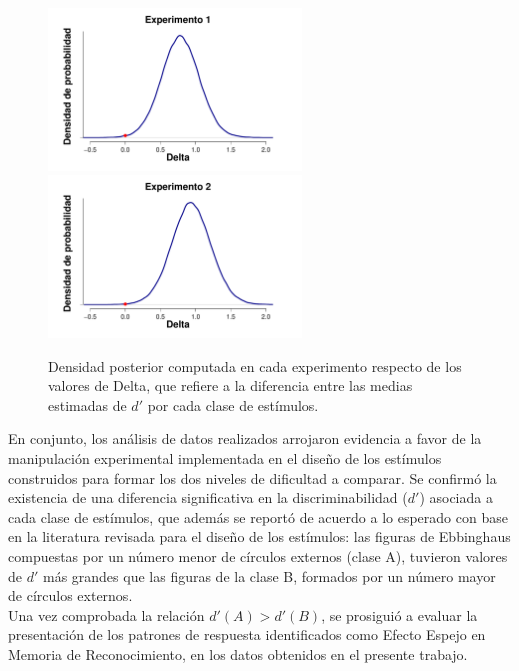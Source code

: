 \begin{figure}[th]
\centering
\includegraphics[width=0.6\textwidth]{Figures/MDelta_DensidadDelta_E1}\\
\includegraphics[width=0.6\textwidth]{Figures/MDelta_DensidadDelta_E2}\\
\caption[Modelo Delta: Densidad posterior de los valores estimados para el parámetro Delta en cada Experimento]{Densidad posterior computada en cada experimento respecto de los valores de Delta, que refiere a la diferencia entre las medias estimadas de $d'$ por cada clase de estímulos.}
\label{fig:Delta}
\end{figure}

En conjunto, los análisis de datos realizados arrojaron evidencia a favor de la manipulación experimental implementada en el diseño de los estímulos construidos para formar los dos niveles de dificultad a comparar. Se confirmó la existencia de una diferencia significativa en la discriminabilidad ($d'$) asociada a cada clase de estímulos, que además se reportó de acuerdo a lo esperado con base en la literatura revisada para el diseño de los estímulos: las figuras de Ebbinghaus compuestas por un número menor de círculos externos (clase A), tuvieron valores de $d'$ más grandes que las figuras de la clase B, formados por un número mayor de círculos externos.\\

Una vez comprobada la relación $d'(A) > d'(B)$, se prosiguió a evaluar la presentación de los patrones de respuesta identificados como Efecto Espejo en Memoria de Reconocimiento, en los datos obtenidos en el presente trabajo.\\












